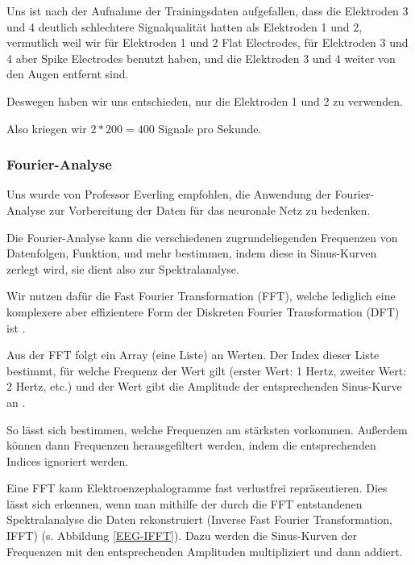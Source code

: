 \documentclass{scrartcl}
\begin{document}
	Uns ist nach der Aufnahme der Trainingsdaten aufgefallen, dass die Elektroden 3 und 4 deutlich schlechtere Signalqualität hatten als Elektroden 1 und 2, vermutlich weil wir für Elektroden 1 und 2 Flat Electrodes, für Elektroden 3 und 4 aber Spike Electrodes benutzt haben, und die Elektroden 3 und 4 weiter von den Augen entfernt sind.

	Deswegen haben wir uns entschieden, nur die Elektroden 1 und 2 zu verwenden.

	Also kriegen wir $2 * 200 = 400$ Signale pro Sekunde.

	\subsubsection{Fourier-Analyse}
	
	Uns wurde von Professor Everling empfohlen, die Anwendung der Fourier-Analyse zur Vorbereitung der Daten für das neuronale Netz zu bedenken.
	
	Die Fourier-Analyse kann die verschiedenen zugrundeliegenden Frequenzen von Datenfolgen, Funktion, und mehr bestimmen, indem diese in Sinus-Kurven zerlegt wird, sie dient also zur Spektralanalyse.

	Wir nutzen dafür die Fast Fourier Transformation (FFT), welche lediglich eine komplexere aber effizientere Form der Diskreten Fourier Transformation (DFT) ist \cite{FFT-DFT}.


	Aus der FFT folgt ein Array (eine Liste) an Werten. Der Index dieser Liste bestimmt, für welche Frequenz der Wert gilt (erster Wert: 1 Hertz, zweiter Wert: 2 Hertz, etc.) und der Wert gibt die Amplitude der entsprechenden Sinus-Kurve an \cite{3b1b:fft}.

	So lässt sich bestimmen, welche Frequenzen am stärksten vorkommen. Außerdem können dann Frequenzen herausgefiltert werden, indem die entsprechenden Indices ignoriert werden.

	Eine FFT kann Elektroenzephalogramme fast verlustfrei repräsentieren. Dies lässt sich erkennen, wenn man mithilfe der durch die FFT entstandenen Spektralanalyse die Daten rekonstruiert (Inverse Fast Fourier Transformation, IFFT) (s. Abbildung \ref{EEG-IFFT}). Dazu werden die Sinus-Kurven der Frequenzen mit den entsprechenden Amplituden multipliziert und dann addiert.
\end{document}
